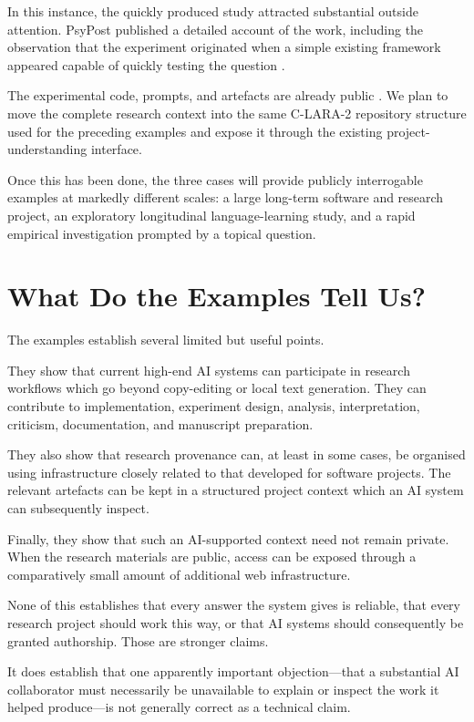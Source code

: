 In this instance, the quickly produced study attracted substantial outside attention. PsyPost published a detailed account of the work, including the observation that the experiment originated when a simple existing framework appeared capable of quickly testing the question \citep{dolan2025grok}.

The experimental code, prompts, and artefacts are already public \citep{raynerChatGPT2025grok}. We plan to move the complete research context into the same C-LARA-2 repository structure used for the preceding examples and expose it through the existing project-understanding interface.

Once this has been done, the three cases will provide publicly interrogable examples at markedly different scales: a large long-term software and research project, an exploratory longitudinal language-learning study, and a rapid empirical investigation prompted by a topical question.


\section{What Do the Examples Tell Us?}

The examples establish several limited but useful points.

They show that current high-end AI systems can participate in research workflows which go beyond copy-editing or local text generation. They can contribute to implementation, experiment design, analysis, interpretation, criticism, documentation, and manuscript preparation.

They also show that research provenance can, at least in some cases, be organised using infrastructure closely related to that developed for software projects. The relevant artefacts can be kept in a structured project context which an AI system can subsequently inspect.

Finally, they show that such an AI-supported context need not remain private. When the research materials are public, access can be exposed through a comparatively small amount of additional web infrastructure.

None of this establishes that every answer the system gives is reliable, that every research project should work this way, or that AI systems should consequently be granted authorship. Those are stronger claims.

It does establish that one apparently important objection---that a substantial AI collaborator must necessarily be unavailable to explain or inspect the work it helped produce---is not generally correct as a technical claim.

